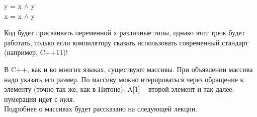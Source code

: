 \begin{lecture}[\lectureSubject]
\begin{lecSection}
\begin{enumerate}
			y = x $\wedge$ y \\
			x = x $\wedge$ y \\
		\end{enumerate}
	\end{lecSection}
	\begin{lecSection}
		Код будет присваивать переменной х различные типы, однако этот трюк будет работать, только если компилятору сказать использовать современный стандарт (например, C++11)!
	\end{lecSection}
	
	\begin{lecSection}
		В C++, как и во многих языках, существуют массивы.
		При объявлении массива надо указать его размер. По массиву можно итерироваться через обращение к элементу (точно так же, как в Питоне): A[1] -- второй элемент и так далее; нумерация идет с \textit{нуля}.\\
		 Подробнее о массивах будет рассказано на следующей лекции.
	\end{lecSection}
\end{lecture}

\renewcommand{\mainFolder}{/home/aleksei/github_projects/latex_works/informatics}
\renewcommand{\myFolder}{\mainFolder/lecture_\arabic{lectureNo}/}

\renewcommand{\lectureSubject}{Адреса и указатели}
%



